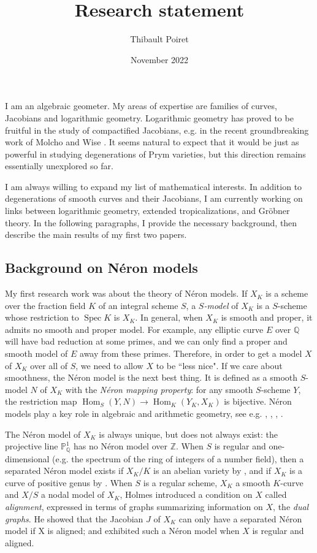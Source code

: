 \documentclass[12pt]{extarticle}
\title{Research statement}
\author{Thibault Poiret}
\date{November 2022}
\DeclareMathOperator{\Hom}{Hom}
\DeclareMathOperator{\Spec}{Spec}
\begin{document}
\maketitle

I am an algebraic geometer. My areas of expertise are families of curves, Jacobians and logarithmic geometry. Logarithmic geometry has proved to be fruitful in the study of compactified Jacobians, e.g. in the recent groundbreaking work of Molcho and Wise \cite{Molcho2022TheLP}. It seems natural to expect that it would be just as powerful in studying degenerations of Prym varieties, but this direction remains essentially unexplored so far.

I am always willing to expand my list of mathematical interests. In addition to degenerations of smooth curves and their Jacobians, I am currently working on links between logarithmic geometry, extended tropicalizations, and Gr\"obner theory. In the following paragraphs, I provide the necessary background, then describe the main results of my first two papers.

\subsection*{Background on N\'eron models}

My first research work was about the theory of Néron models. If $X_K$ is a scheme over the fraction field $K$ of an integral scheme $S$, a \emph{$S$-model} of $X_K$ is a $S$-scheme whose restriction to $\Spec K$ is $X_K$. In general, when $X_K$ is smooth and proper, it admits no smooth and proper model. For example, any elliptic curve $E$ over $\mathbb Q$ will have bad reduction at some primes, and we can only find a proper and smooth model of $E$ away from these primes. Therefore, in order to get a model $X$ of $X_K$ over all of $S$, we need to allow $X$ to be ``less nice". If we care about smoothness, the Néron model is the next best thing. It is defined as a smooth $S$-model $N$ of $X_K$ with the \emph{Néron mapping property}: for any smooth $S$-scheme $Y$, the restriction map $\Hom_S(Y,N) \to \Hom_K(Y_K,X_K)$ is bijective. N\'eron models play a key role in algebraic and arithmetic geometry, see e.g. \cite{Ogg}, \cite{SerreTate}, \cite{conradsemistable}, \cite{EdixhovenLido2021}.

The Néron model of $X_K$ is always unique, but does not always exist: the projective line $\mathbb P^1_{\mathbb Q}$ has no Néron model over $\mathbb Z$. When $S$ is regular and one-dimensional (e.g. the spectrum of the ring of integers of a number field), then a separated Néron model exists if $X_K/K$ is an abelian variety by \cite{Neron1964Modeles-minimau}, and if $X_K$ is a curve of positive genus by \cite{Liu_2015}. When $S$ is a regular scheme, $X_K$ a smooth $K$-curve and $X/S$ a nodal model of $X_K$, Holmes introduced a condition on $X$ called \emph{alignment}, expressed in terms of graphs summarizing information on $X$, the \emph{dual graphs}. He showed that the Jacobian $J$ of $X_K$ can only have a separated Néron model if X is aligned; and exhibited such a Néron model when $X$ is regular and aligned.
\end{document}
